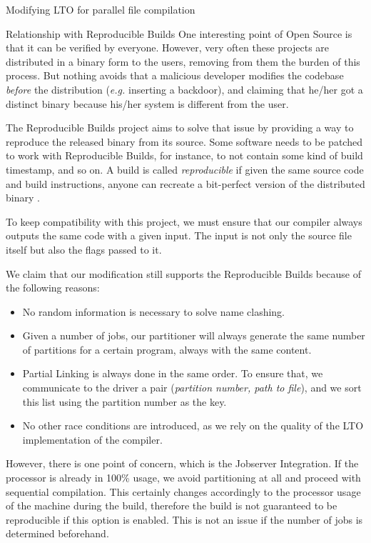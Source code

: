 \begin{section}{Modifying LTO for parallel file compilation}
\begin{subsection}{Relationship with Reproducible Builds}
One interesting point of Open Source is that it can be verified by everyone.
However, very often these projects are distributed in a binary form to the
users, removing from them the burden of this process. But nothing avoids that a
malicious developer modifies the codebase \textit{before} the distribution
(\textit{e.g.} inserting a backdoor), and claiming that he/her got a distinct
binary because his/her system is different from the user.

The Reproducible Builds project aims to solve that issue by providing a way to
reproduce the released binary from its source. Some software needs to
be patched to work with Reproducible Builds, for instance,
to not contain some kind of build timestamp, and so on. A build
is called \textit{reproducible} if given the same source code and build
instructions, anyone can recreate a bit-perfect version of the distributed
binary \citep{reproducible_builds}.

To keep compatibility with this project, we must ensure that our compiler
always outputs the same code with a given input. The input is not only
the source file itself but also the flags passed to it.

We claim that our modification still supports the Reproducible Builds because
of the following reasons:

\begin{itemize}
	\item No random information is necessary to solve name clashing.
	\item Given a number of jobs, our partitioner will always generate
	the same number of partitions for a certain program, always with the same content.
	\item Partial Linking is always done in the same order. To ensure that,
	we communicate to the driver a pair (\textit{partition number, path to file}),
	and we sort this list using the partition number as the key.
	\item No other race conditions are introduced, as we rely on the quality of
	the LTO implementation of the compiler.
\end{itemize}

However, there is one point of concern, which is the Jobserver Integration.  If
the processor is already in 100\% usage, we avoid partitioning at all and
proceed with sequential compilation. This certainly changes accordingly to the
processor usage of the machine during the build, therefore the build is not
guaranteed to be reproducible if this option is enabled. This is not an issue
if the number of jobs is determined beforehand.


\end{subsection}
\end{section}
